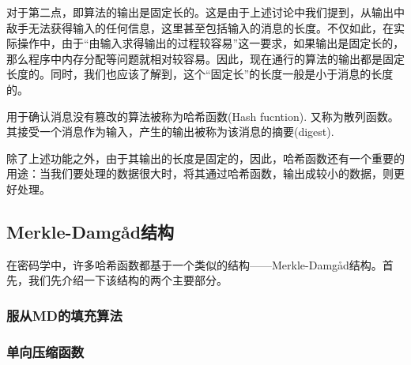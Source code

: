 对于第二点，即算法的输出是固定长的。这是由于上述讨论中我们提到，从输出中敌手无法获得输入的任何信息，这里甚至包括输入的消息的长度。不仅如此，在实际操作中，由于“由输入求得输出的过程较容易”这一要求，如果输出是固定长的，那么程序中内存分配等问题就相对较容易。因此，现在通行的算法的输出都是固定长度的。同时，我们也应该了解到，这个“固定长”的长度一般是小于消息的长度的。\par
用于确认消息没有篡改的算法被称为哈希函数(Hash fucntion). 又称为散列函数。其接受一个消息作为输入，产生的输出被称为该消息的摘要(digest).\par
除了上述功能之外，由于其输出的长度是固定的，因此，哈希函数还有一个重要的用途：当我们要处理的数据很大时，将其通过哈希函数，输出成较小的数据，则更好处理。
\subsection{Merkle-Damg\aa d结构}
在密码学中，许多哈希函数都基于一个类似的结构——Merkle-Damg\aa d结构。首先，我们先介绍一下该结构的两个主要部分。
\subsubsection{服从MD的填充算法}

\subsubsection{单向压缩函数}